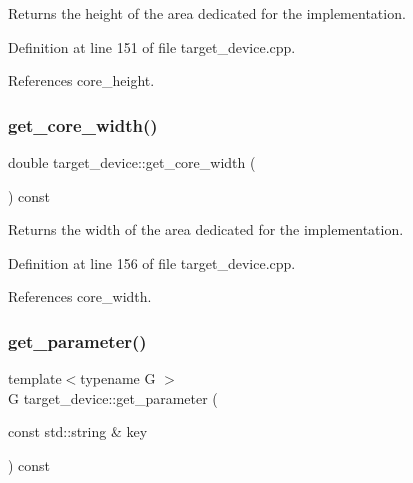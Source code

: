Returns the height of the area dedicated for the implementation. 



Definition at line 151 of file target\+\_\+device.\+cpp.



References core\+\_\+height.

\mbox{\label{classtarget__device_a9629242b6f9f54f51105cdebf9835442}} 
\subsubsection{\texorpdfstring{get\+\_\+core\+\_\+width()}{get\_core\_width()}}
{\footnotesize\ttfamily double target\+\_\+device\+::get\+\_\+core\+\_\+width (\begin{DoxyParamCaption}{ }\end{DoxyParamCaption}) const}



Returns the width of the area dedicated for the implementation. 



Definition at line 156 of file target\+\_\+device.\+cpp.



References core\+\_\+width.

\mbox{\label{classtarget__device_a8661666c67663c3826ecd5f92f3e8711}} 
\subsubsection{\texorpdfstring{get\+\_\+parameter()}{get\_parameter()}}
{\footnotesize\ttfamily template$<$typename G $>$ \\
G target\+\_\+device\+::get\+\_\+parameter (\begin{DoxyParamCaption}\item[{const std\+::string \&}]{key }\end{DoxyParamCaption}) const\hspace{0.3cm}{\ttfamily [inline]}}



